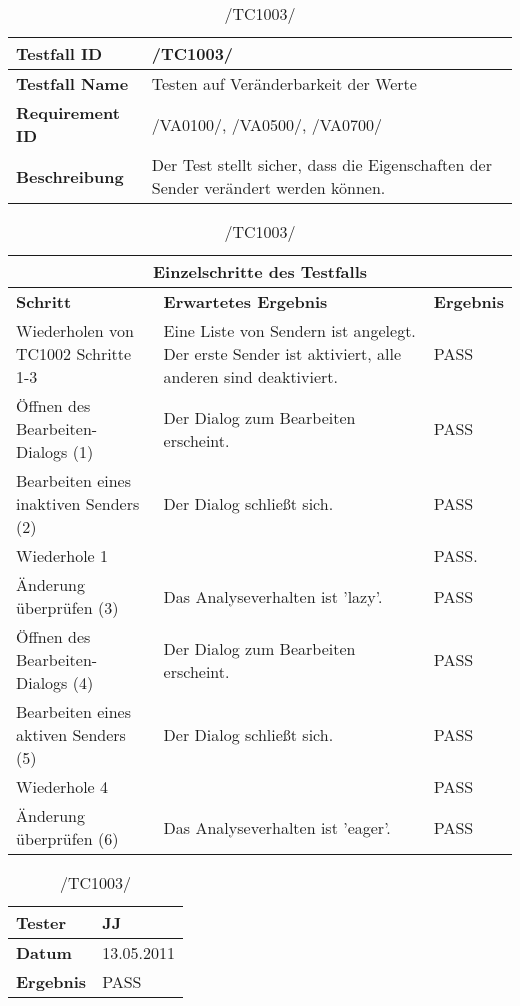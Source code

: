 \begin{table}[h]
\caption{/TC1003/}
\label{tab:TC1003}
\begin{center}
\begin{tabular}{|p{3.5cm}|p{11cm}|}
\hline
\textbf{Testfall ID} & /TC1003/\\
\hline
\textbf{Testfall Name} & Testen auf Veränderbarkeit der Werte
\\
\hline
\textbf{Requirement ID} & /VA0100/, /VA0500/, /VA0700/\\
\hline
\textbf{Beschreibung} & Der Test stellt sicher, dass die Eigenschaften der
Sender verändert werden können.
\\
\hline
\end{tabular}
\begin{tabular}{|p{4cm}|p{7.8cm}|p{2.3cm}|}
\multicolumn{3}{|c|}{\textbf{Einzelschritte des Testfalls}} \\
\hline
\textbf{Schritt} & \textbf{Erwartetes Ergebnis} & \textbf{Ergebnis}\\
\hline
Wiederholen von TC1002 Schritte 1-3 & 
Eine Liste von Sendern ist
 angelegt. Der erste Sender ist aktiviert, alle anderen sind deaktiviert. & PASS
\\
\hline
Öffnen des Bearbeiten-Dialogs (1) & Der Dialog zum Bearbeiten erscheint. & PASS
 \\
\hline
Bearbeiten eines inaktiven Senders (2) & Der Dialog schließt sich. & PASS
 \\
\hline
Wiederhole 1 & & PASS.
\\
\hline
Änderung überprüfen (3) & Das Analyseverhalten ist 'lazy'. & PASS
\\
\hline
Öffnen des Bearbeiten-Dialogs (4) & Der Dialog zum Bearbeiten erscheint. & PASS
\\
\hline
Bearbeiten eines aktiven Senders (5) & Der Dialog schließt sich. & PASS
\\
\hline
Wiederhole 4 & & PASS
\\
\hline
Änderung überprüfen (6) & Das Analyseverhalten ist 'eager'. & PASS
\\
\hline
\end{tabular}
\begin{tabular}{|p{3.5cm}|p{11cm}|}
\textbf{Tester} & JJ\\
\hline
\textbf{Datum} & 13.05.2011\\
\hline
\textbf{Ergebnis} & PASS\\
\hline
\end{tabular}
\end{center}
\end{table}

